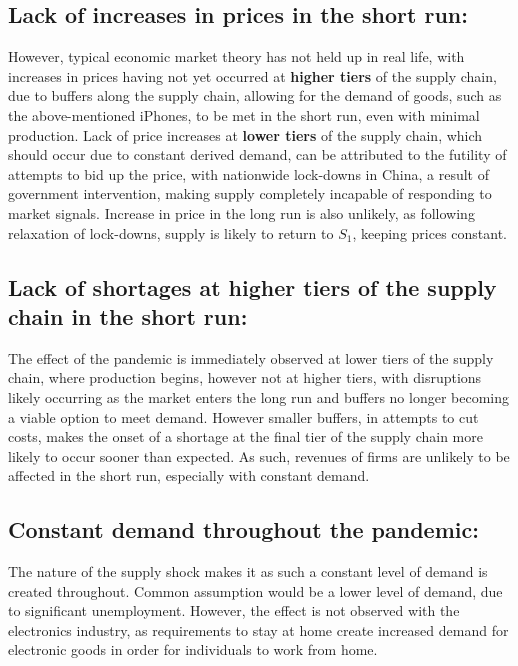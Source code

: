 \documentclass[11pt, a4paper]{article}
\begin{document}
		\subsection{Lack of increases in prices in the short run:}
			
			However, typical economic market theory has not held up in real life, with increases in prices having not yet occurred at \textbf{higher tiers} of the supply chain, due to buffers along the supply chain, allowing for the demand of goods, such as the above-mentioned iPhones, to be met in the short run, even with minimal production. Lack of price increases at \textbf{lower tiers} of the supply chain, which should occur due to constant derived demand, can be attributed to the futility of attempts to bid up the price, with nationwide lock-downs in China, a result of government intervention, making supply completely incapable of responding to market signals. Increase in price in the long run is also unlikely, as following relaxation of lock-downs, supply is likely to return to $S_1$, keeping prices constant.
			
		\subsection{Lack of shortages at higher tiers of the supply chain in the short run:}

			The effect of the pandemic is immediately observed at lower tiers of the supply chain, where production begins, however not at higher tiers, with disruptions likely occurring as the market enters the long run and buffers no longer becoming a viable option to meet demand. However smaller buffers, in attempts to cut costs, makes the onset of a shortage at the final tier of the supply chain more likely to occur sooner than expected. As such, revenues of firms are unlikely to be affected in the short run, especially with constant demand.
			
		\subsection{Constant demand throughout the pandemic:}
			
			The nature of the supply shock makes it as such a constant level of demand is created throughout. Common assumption would be a lower level of demand, due to significant unemployment. However, the effect is not observed with the electronics industry, as requirements to stay at home create increased demand for electronic goods in order for individuals to work from home.
\end{document}
